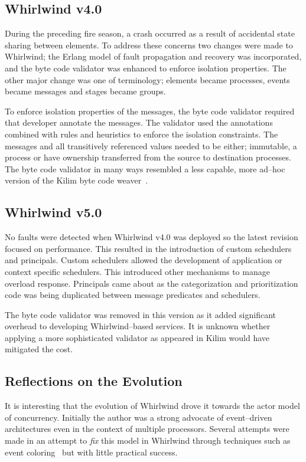 \documentclass[conference]{IEEEtran}
\begin{document}
\subsection{Whirlwind v4.0}

During the preceding fire season, a crash occurred as a result of accidental state sharing between elements. To address these concerns two changes were made to Whirlwind; the Erlang model of fault propagation and recovery was incorporated, and the byte code validator was enhanced to enforce isolation properties. The other major change was one of terminology; elements became processes, events became messages and stages became groups.

To enforce isolation properties of the messages, the byte code validator required that developer annotate the messages. The validator used the annotations combined with rules and heuristics to enforce the isolation constraints. The messages and all transitively referenced values needed to be either; immutable, a process or have ownership transferred from the source to destination processes. The byte code validator in many ways resembled a less capable, more ad--hoc version of the Kilim byte code weaver~\cite{Srinivasan:08:Kilim}.

\subsection{Whirlwind v5.0}

No faults were detected when Whirlwind v4.0 was deployed so the latest revision focused on performance. This resulted in the introduction of custom schedulers and principals. Custom schedulers allowed the development of application or context specific schedulers. This introduced other mechanisms to manage overload response. Principals came about as the categorization and prioritization code was being duplicated between message predicates and schedulers.

The byte code validator was removed in this version as it added significant overhead to developing Whirlwind--based services. It is unknown whether applying a more sophisticated validator as appeared in Kilim would have mitigated the cost.

\subsection{Reflections on the Evolution}

It is interesting that the evolution of Whirlwind drove it towards the actor model of concurrency. Initially the author was a strong advocate of event--driven architectures even in the context of multiple processors. Several attempts were made in an attempt to \emph{fix} this model in Whirlwind through techniques such as event coloring~\cite{Dabek02EventDriven} but with little practical success. 
\end{document}

